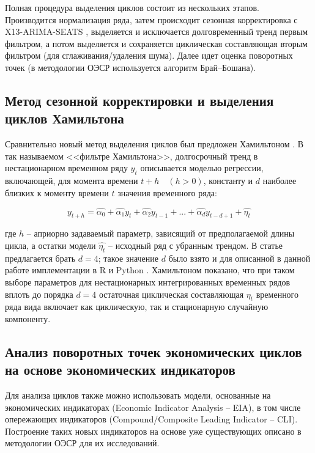 \documentclass[../report.tex]{subfiles}
\begin{document}
	Полная процедура выделения циклов состоит из нескольких этапов. Производится нормализация ряда, затем происходит сезонная корректировка с X13-ARIMA-SEATS \cite{seasonalManual}, выделяется и исключается долговременный тренд первым фильтром, а потом выделяется и сохраняется циклическая составляющая вторым фильтром (для сглаживания/удаления шума). Далее идет оценка поворотных точек (в методологии ОЭСР \cite{oecdCycleExtraction} используется алгоритм Брай–Бошана).
	
	\subsection{Метод сезонной корректировки и выделения циклов Хамильтона}
	
	Сравнительно новый метод выделения циклов был предложен Хамильтоном \cite{hamNewApproach}. В так называемом <<фильтре Хамильтона>>, долгосрочный тренд в нестационарном временном ряду $y_t$  описывается моделью регрессии, включающей, для момента времени  $t+h \quad (h>0)$, константу и $d$ наиболее близких к моменту времени $t$ значения временного ряда:
	
	\begin{equation}
	y_{t+h} = \hat{\alpha_{0}} + \hat{\alpha_{1}}y_{t} + \hat{\alpha_{2}}y_{t-1}
	+ ... + \hat{\alpha_{d}}y_{t-d+1} + \hat{\eta_{t}}
	\end{equation}
	
	где $h$ – априорно задаваемый параметр, зависящий от предполагаемой длины цикла, а остатки модели $\hat{\eta_{t}}$ – исходный ряд с убранным трендом. В статье предлагается брать $d=4$; такое значение $d$ было взято и для описанной в данной работе имплементации в R и Python \cite{makarevich_bsu_conf_2017}. Хамильтоном показано, что при таком выборе параметров для нестационарных интегрированных временных рядов вплоть до порядка $d=4$ остаточная циклическая составляющая $\eta_{t}$ временного ряда вида включает как циклическую, так и стационарную случайную компоненту. 
	
	
	\subsection{Анализ поворотных точек экономических циклов на основе экономических индикаторов}
	
	Для анализа циклов также можно использовать модели, основанные на экономических индикаторах (Economic Indicator Analysis – EIA), в том числе опережающих индикаторов (Compound/Composite Leading Indicator – CLI). Построение таких новых индикаторов на основе уже существующих описано в методологии ОЭСР \cite{oecdCLI} для их исследований. 
	
\end{document}
